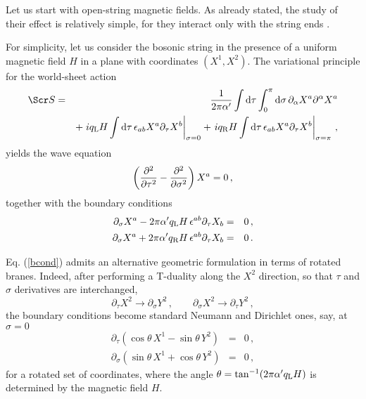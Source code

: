 \documentclass[a4paper,12pt]{article}
\begin{document}
Let us start with open-string magnetic fields. As already stated,
the study of their effect is relatively simple, for they 
interact only with the string ends \cite{aboo}. 

For simplicity, let us consider the bosonic string in the presence of a 
uniform magnetic field $H$ in a plane with coordinates $(X^1 , X^2)$.
The variational principle for the world-sheet action
\begin{eqnarray}
{\Scr S} &=& {1\over 2\pi\alpha '}\int {\rm d}\tau \int_0^\pi {\rm d}
\sigma \, \partial_\alpha X^a \partial^\alpha X^a
\\
& & + \left. i q_{\rm L} H \int {\rm d}\tau \, \epsilon_{ab} X^a 
\partial_\tau X^b
\right|_{\sigma=0}
+ \left. i q_{\rm R} H \int {\rm d}\tau \, \epsilon_{ab} X^a \partial_\tau 
X^b \right|_{\sigma=\pi} \,,\nonumber
\end{eqnarray}
yields the wave equation
\begin{equation}
\left( {\partial^2 \over \partial\tau^2} - {\partial^2 \over \partial\sigma^2}
\right) X^a = 0 \,,
\end{equation}
together with the boundary conditions
\begin{eqnarray}
\partial_\sigma X^a - 2\pi \alpha ' q_{\rm L} H \, 
\epsilon^{ab} \partial_\tau X_b &=& 0 \,,
\nonumber \\
\partial_\sigma X^a + 2 \pi \alpha ' q_{\rm R} H \, 
\epsilon^{ab} \partial_\tau X_b &=& 0 \,.
\label{bcond}
\end{eqnarray}

Eq. (\ref{bcond}) admits an alternative geometric formulation in terms of
rotated branes\cite{bdl}. 
Indeed, after performing a T-duality along the $X^2$ direction,
so that $\tau$ and $\sigma$ derivatives are interchanged,
\begin{equation}
\partial_\tau X^2 \rightarrow \partial_\sigma Y^2\,, \qquad
\partial_\sigma X^2 \rightarrow \partial_\tau Y^2\,,
\end{equation}
the boundary conditions become standard Neumann and Dirichlet ones,
say, at $\sigma = 0$
\begin{eqnarray}
\partial_\tau \left( \cos \theta \, X^1 - \sin \theta \, Y^2 \right) &=& 0\,,
\nonumber \\
\partial_\sigma \left( \sin\theta \, X^1 + \cos\theta \, Y^2 \right) &=& 0\,,
\label{rotated}
\end{eqnarray}
for a rotated set of coordinates, where the angle $\theta = \tan^{-1} 
(2 \pi \alpha ' q_{\rm L} H )$
is determined by the magnetic field $H$. 
\end{document}
